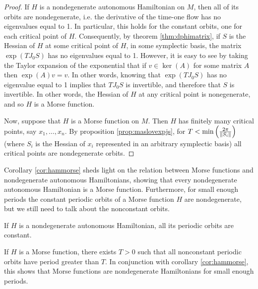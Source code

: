 \begin{proof}
If $H$ is a nondegenerate autonomous Hamiltonian on $M$, then all of its orbits are nondegenerate, i.e. the derivative of the time-one flow has no eigenvalues equal to 1. In particular, this holds for the constant orbits, one for each critical point of $H$. Consequently, by theorem \ref{thm:dphimatrix}, if $S$ is the Hessian of $H$ at some critical point of $H$, in some symplectic basis, the matrix $\exp(T J_0 S)$ has no eigenvalues equal to 1. However, it is easy to see by taking the Taylor expansion of the exponential that if $v \in \ker(A)$ for some matrix $A$ then $\exp(A) v = v$. In other words, knowing that $\exp(T J_0 S)$ has no eigenvalue equal to 1 implies that $T J_0 S$ is invertible, and therefore that $S$ is invertible. In other words, the Hessian of $H$ at any critical point is nonegenerate, and so $H$ is a Morse function.

Now, suppose that $H$ is a Morse function on $M$. Then $H$ has finitely many critical points, say $x_1, \dots, x_n$. By proposition \ref{prop:maslovexpjs}, for $T < \min\left(\frac{2\pi}{\lVert S_i\rVert}\right)$ (where $S_i$ is the Hessian of $x_i$ represented in an arbitrary symplectic basis) all critical points are nondegenerate orbits.
\end{proof}

Corollary \ref{cor:hammorse} sheds light on the relation between Morse functions and nondegenerate autonomous Hamiltonians, showing that every nondegenerate autonomous Hamiltonian is a Morse function. Furthermore, for small enough periods the constant periodic orbits of a Morse function $H$ are nondegenerate, but we still need to talk about the nonconstant orbits.

\begin{prop}\label{prop:nonconstantorbits}
If $H$ is a nondegenerate autonomous Hamiltonian, all its periodic orbits are constant.

If $H$ is a Morse function, there exists $T>0$ such that all nonconstant periodic orbits have period greater than $T$. In conjunction with corollary \ref{cor:hammorse}, this shows that Morse functions are nondegenerate Hamiltonians for small enough periods.
\end{prop}

